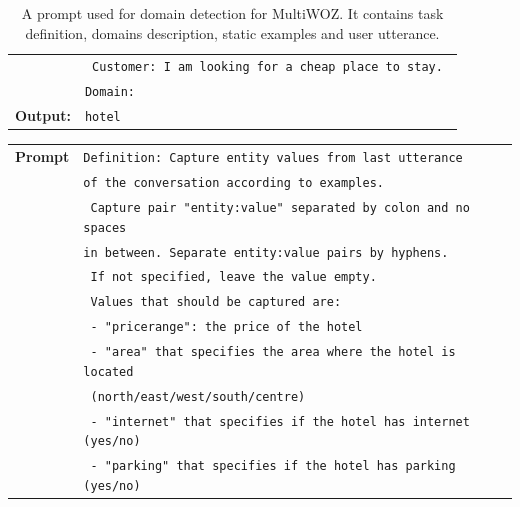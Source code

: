 \begin{table}[tp]
\begin{tabular}{rl}
& \texttt{{\color{orange!50!yellow!90!black!100!} Customer: I am looking for a cheap place to stay. }}\\
& \texttt{Domain:} \\
      \midrule
      \textbf{Output:} & \texttt{hotel} \\
      \bottomrule
  \end{tabular}
    \caption{A prompt used for domain detection for MultiWOZ.
  It contains {\color{cyan!80!yellow!80!black!100} task definition},  {\color{green!100!yellow!70!black!100!}domains description}, {\color{red!50!yellow!90!black!100!} static examples} and {\color{orange!50!yellow!90!black!100!} user utterance}.}
  \label{07_tab:domain}
\end{table}

\begin{table}[tp]
    \centering\small
    \begin{tabular}{rl}
      \toprule
      \textbf{Prompt} & \texttt{{\color{cyan!80!yellow!80!black!100 }Definition: Capture entity values from last utterance}}\\
      & \texttt{{\color{cyan!80!yellow!80!black!100 }of the conversation according to examples.}} \\
    & \texttt{{\color{cyan!80!yellow!80!black!100 } Capture pair "entity:value" separated by colon and no spaces}}\\ 
    & \texttt{{\color{cyan!80!yellow!80!black!100 }in between. Separate entity:value pairs by hyphens.}} \\
      & \texttt{{\color{cyan!80!yellow!80!black!100!} If not specified, leave the value empty.}}\\ 
      & \texttt{{\color{cyan!80!yellow!80!black!100!} Values that should be captured are: }} \\
      & \texttt{{\color{green!100!yellow!70!black!100!} - "pricerange": the price of the hotel} }\\
      & \texttt{{\color{green!100!yellow!70!black!100!} - "area" that specifies the area where the hotel is located}} \\
      & \texttt{{\color{green!100!yellow!70!black!100!}
      (north/east/west/south/centre)}} \\
      & \texttt{{\color{green!100!yellow!70!black!100!} - "internet" that specifies if the hotel has internet (yes/no)}} \\
      & \texttt{{\color{green!100!yellow!70!black!100!} - "parking" that specifies if the hotel has parking (yes/no)}} \\

\end{tabular}
\end{table}
